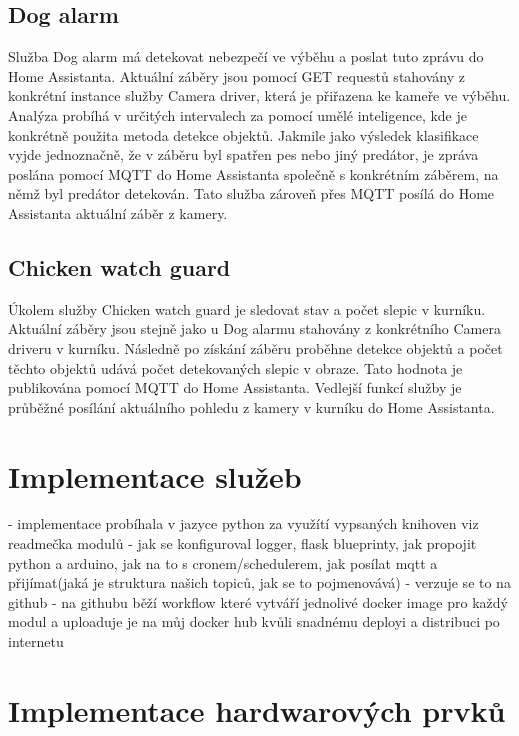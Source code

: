 \subsection{Dog alarm}
Služba Dog alarm má detekovat nebezpečí ve výběhu a poslat tuto zprávu do Home Assistanta.\newline
Aktuální záběry jsou pomocí GET requestů stahovány z konkrétní instance služby Camera driver, která je přiřazena ke kameře ve výběhu.
Analýza probíhá v určitých intervalech za pomocí umělé inteligence, kde je konkrétně použita metoda detekce objektů.
Jakmile jako výsledek klasifikace vyjde jednoznačně, že v záběru byl spatřen pes nebo jiný predátor, je zpráva poslána pomocí MQTT do Home Assistanta společně s konkrétním záběrem, na němž byl predátor detekován.
Tato služba zároveň přes MQTT posílá do Home Assistanta aktuální záběr z kamery.

\subsection{Chicken watch guard}
Úkolem služby Chicken watch guard je sledovat stav a počet slepic v kurníku.\newline
Aktuální záběry jsou stejně jako u Dog alarmu stahovány z konkrétního Camera driveru v kurníku.
Následně po získání záběru proběhne detekce objektů a počet těchto objektů udává počet detekovaných slepic v obraze.
Tato hodnota je publikována pomocí MQTT do Home Assistanta.
Vedlejší funkcí služby je průběžné posílání aktuálního pohledu z kamery v kurníku do Home Assistanta.

\section{Implementace služeb}\label{sec:implementace-sluzeb}
- implementace probíhala v jazyce python za využítí vypsaných knihoven viz readmečka modulů\newline
- jak se konfiguroval logger, flask blueprinty, jak propojit python a arduino, jak na to s cronem/schedulerem, jak posílat mqtt a přijímat(jaká je struktura našich topiců, jak se to pojmenovává)
- verzuje se to na github
- na githubu běží workflow které vytváří jednolivé docker image pro každý modul a uploaduje je na můj docker hub kvůli snadnému deployi a distribuci po internetu

\section{Implementace hardwarových prvků}\label{sec:implementace-hardwarovych-prvku}
